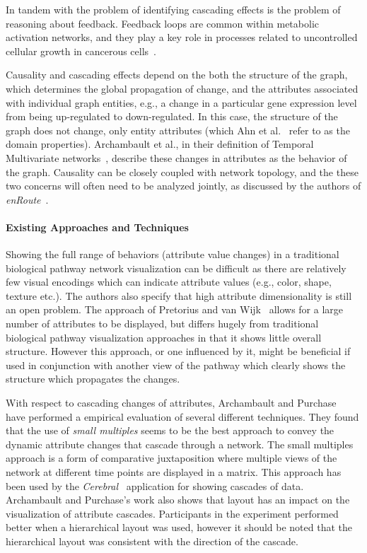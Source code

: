 \documentclass[twocolumn]{bmcart}%
\begin{document}
In tandem with the problem of identifying cascading effects is the problem of reasoning about feedback.
Feedback loops are common within metabolic activation networks, and they play a key role in processes related to uncontrolled cellular growth in cancerous cells~\cite{cairns2011regulation}.

Causality and cascading effects depend on the both the structure of the graph, which determines the global propagation of change, and the attributes associated with individual graph entities, e.g., a change in a particular gene expression level from being up-regulated to down-regulated.
In this case, the structure of the graph does not change, only entity attributes (which Ahn et al.~\cite{Ahn2014} refer to as the domain properties).
Archambault et al., in their definition of Temporal Multivariate networks~\cite{archambault2014temporal}, describe these changes in attributes as the behavior of the graph.
Causality can be closely coupled with network topology, and the these two concerns will often need to be analyzed jointly, as discussed by the authors of \textit{enRoute}~\cite{partl2012enroute}.

\paragraph*{Existing Approaches and Techniques}

Showing the full range of behaviors (attribute value changes) in a traditional biological pathway network visualization can be difficult as there are relatively few visual encodings which can indicate attribute values (e.g., color, shape, texture etc.).
The authors also specify that high attribute dimensionality is still an open problem.
The approach of Pretorius and van Wijk~\cite{pretorius2008} allows for a large number of attributes to be displayed, but differs hugely from traditional biological pathway visualization approaches in that it shows little overall structure.
However this approach, or one influenced by it, might be beneficial if used in conjunction with another view of the pathway which clearly shows the structure which propagates the changes.

With respect to cascading changes of attributes, Archambault and Purchase~\cite{Archambault2016} have performed a empirical evaluation of several different techniques.
They found that the use of \emph{small multiples} seems to be the best approach to convey the dynamic attribute changes that cascade through a network.
The small multiples approach is a form of comparative juxtaposition where multiple views of the network at different time points are displayed in a matrix.
This approach has been used by the \textit{Cerebral}~\cite{Barsky2008cerebral} application for showing cascades of data.
Archambault and Purchase's work also shows that layout has an impact on the visualization of attribute cascades.
Participants in the experiment performed better when a hierarchical layout was used, however it should be noted that the hierarchical layout was consistent with the direction of the cascade.
\end{document}
